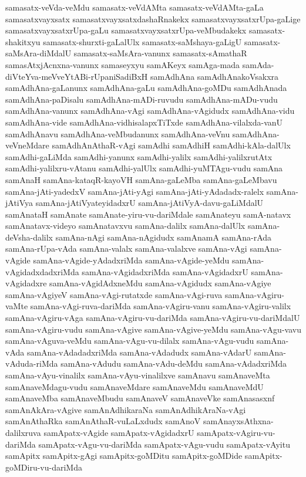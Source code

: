 {samasatx-veVda-veMdu
samasatx-veVdAMta
samasatx-veVdAMta-gaLa
samasatxvayxsatx
samasatxvayxsatxdashaRnakekx
samasatxvayxsatxrUpa-gaLige
samasatxvayxsatxrUpa-gaLu
samasatxvayxsatxrUpa-veMbudakekx
samasatx-shakitxyu
samasatx-shurxti-gaLalUlx
samasatx-saMshaya-gaLigU
samasatx-saMsAra-diMdalU
samasatx-saMsAra-vanunx
samasatx-sAmathaR
samasAtxjAcnxna-vanunx
samaseyxyu
samAKeyx
samAga-mada
samAda-diVteYva-meVveYtABi-rUpaniSadiBxH
samAdhAna
samAdhAnakoVsakxra
samAdhAna-gaLanunx
samAdhAna-gaLu
samAdhAna-goMDu
samAdhAnada
samAdhAna-paDisalu
samAdhAna-mADi-ruvudu
samAdhAna-mADu-vudu
samAdhAna-vanunx
samAdhAna-vAgi
samAdhAna-vAgidudx
samAdhAna-vidu
samAdhAna-vide
samAdhAna-vidhisalapxTiTxde
samAdhAna-vilalxda-vanU
samAdhAnavu
samAdhAna-veMbudanunx
samAdhAna-veVnu
samAdhAna-veVneMdare
samAdhAnAthaR-vAgi
samAdhi
samAdhiH
samAdhi-kAla-dalUlx
samAdhi-gaLiMda
samAdhi-yanunx
samAdhi-yalilx
samAdhi-yalilxrutAtx
samAdhi-yalilxru-vAtanu
samAdhi-yalUlx
samAdhi-yuMTAgu-vudu
samAna
samAnaH
samAna-kataqR-kayoVH
samAna-gaLeMba
samAna-gaLeMbavu
samAna-jAti-yadedxV
samAna-jAti-yAgi
samAna-jAti-yAdadadx-ralelx
samAna-jAtiVya
samAna-jAtiVyateyidadxrU
samAna-jAtiVyA-davu-gaLiMdalU
samAnataH
samAnate
samAnate-yiru-vu-dariMdale
samAnateyu
samA-natavx
samAnatavx-videyo
samAnatavxvu
samAna-dalilx
samAna-dalUlx
samAna-deVsha-dalilx
samAna-nAgi
samAna-nAgidudx
samAnamA
samAna-rAda
samAna-rUpa-vAda
samAna-valalx
samAna-valalxve
samAna-vAgi
samAna-vAgide
samAna-vAgide-yAdadxriMda
samAna-vAgide-yeMdu
samAna-vAgidadxdadxriMda
samAna-vAgidadxriMda
samAna-vAgidadxrU
samAna-vAgidadxre
samAna-vAgidAdxneMdu
samAna-vAgidudx
samAna-vAgiye
samAna-vAgiyeV
samAna-vAgi-rutatxde
samAna-vAgi-ruva
samAna-vAgiru-vaMte
samAna-vAgi-ruva-dariMda
samAna-vAgiru-vanu
samAna-vAgiru-valilx
samAna-vAgiru-vAga
samAna-vAgiru-vu-dariMda
samAna-vAgiru-vu-dariMdalU
samAna-vAgiru-vudu
samAna-vAgive
samAna-vAgive-yeMdu
samAna-vAgu-vavu
samAna-vAguva-veMdu
samAna-vAgu-vu-dilalx
samAna-vAgu-vudu
samAna-vAda
samAna-vAdadadxriMda
samAna-vAdadudx
samAna-vAdarU
samAna-vAduda-riMda
samAna-vAdudu
samAna-vAdu-deMdu
samAna-vAdadxriMda
samAna-vAyu-vinalilx
samAna-vAyu-vinalilxve
samAnavu
samAnaveMta
samAnaveMdagu-vudu
samAnaveMdare
samAnaveMdu
samAnaveMdU
samAnaveMba
samAnaveMbudu
samAnaveV
samAnaveVke
samAnasasxnf
samAnAkAra-vAgive
samAnAdhikaraNa
samAnAdhikAraNa-vAgi
samAnAthaRka
samAnAthaR-vuLaLxdudx
samAnoV
samAnayxsAthxna-dalilxruva
samApatx-vAgide
samApatx-vAgidadxrU
samApatx-vAgiru-vu-dariMda
samApatx-vAgu-vu-dariMda
samApatx-vAgu-vudu
samApatx-vAyitu
samApitx
samApitx-gAgi
samApitx-goMDitu
samApitx-goMDide
samApitx-goMDiru-vu-dariMda
}
